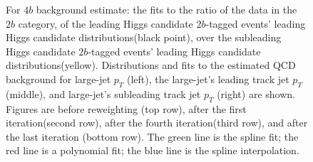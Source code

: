 \begin{figure}[htbp!]
\begin{center}
\caption{For $4b$ background estimate: the fits to the ratio of the data in the $2b$ category, of the leading Higgs candidate $2b$-tagged events' leading Higgs candidate distributions(black point), over the subleading Higgs candidate $2b$-tagged events' leading Higgs candidate distributions(yellow). Distributions and fits to the estimated QCD background for large-\R jet $p_{T}$ (left),  the large-\R jet's leading track jet $p_T$ (middle), and large-\R jet's subleading track jet $p_T$ (right) are shown.  Figures are before reweighting (top row), after the first iteration(second row), after the fourth iteration(third row), and after the last iteration (bottom row). The green line is the spline fit; the red line is a polynomial fit; the blue line is the spline interpolation.}
\label{fig:rw-4b-subl}
\end{center}
\end{figure}


